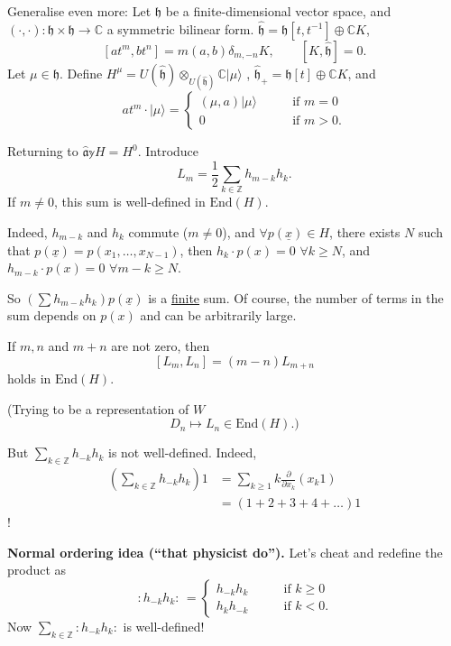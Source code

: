 \medskip\noindent
Generalise even more: Let $\mathfrak{h}$ be a finite-dimensional
vector space, and 
$(\cdot,\cdot): \mathfrak{h} \times \mathfrak{h} \to \mathbb{C}$
a symmetric bilinear form.
$\hat{\mathfrak{h}}=\mathfrak{h}[t,t^{-1}]\oplus \mathbb{C}K$,
$$
[at^m,bt^n]=m(a,b)\delta_{m,-n}K,\qquad [K,\hat{\mathfrak{h}}]=0.
$$
Let $\mu\in \mathfrak{h}$. Define
$H^\mu=U(\hat{\mathfrak{h}})\otimes_{U(\hat{\mathfrak{h}})}\mathbb{C}|\mu\rangle$ 
, $\hat{\mathfrak{h}}_+=\mathfrak{h}[t]\oplus\mathbb{C}K$, and
$$
at^m\cdot |\mu\rangle=\begin{cases}
(\mu,a)|\mu\rangle\qquad &\text{if } m=0\\
0\qquad &\text{if }m>0.
\end{cases}
$$ 

\medskip\noindent
Returning to $\hat{\mathfrak{a}}\mathbb{y}H=H^0$. Introduce
$$
L_m=\frac{1}{2}\sum_{k \in \mathbb{Z}}h_{m-k}h_k.
$$
If $m \neq 0$, this sum is well-defined in $\text{End}(H)$.

Indeed, $h_{m-k}$ and $h_k$ commute ($m \neq 0$), and 
$\forall  p(\underline{x})\in H$, there exists $N$ 
such that $p(\underline{x})=p(x_1,\ldots,x_{N-1})$,
then $h_k\cdot p(x)=0$ $\forall  k \geq N$,
and $h_{m-k}\cdot p(x)=0$ $\forall m-k \geq N$.

So $(\sum h_{m-k}h_k)p(\underline{x})$ is a \underline{finite} sum.
Of course, the number of terms in the sum depends on $p(x)$ and can be
arbitrarily large.

\begin{exercise}
\label{exercise-hard}
If  $m,n$ and $m+n$ are not zero, then
$$
[L_m,L_n]=(m-n)L_{m+n}
$$
holds in $\text{End}(H)$.

(Trying to be a representation of $W$
 $$
D_n \mapsto L_n \in \text{End}(H).)
$$
\end{exercise}

But $\sum_{k \in \mathbb{Z}}h_{-k}h_k$ is not well-defined.
Indeed,
\begin{align*}
\left(\sum_{k \in \mathbb{Z}}h_{-k}h_k\right)1&=
\sum_{k \geq 1}k\frac{\partial }{\partial x_k}(x_k 1)\\
&=(1+2+3+4+\ldots)1
\end{align*}
!

\medskip\noindent
{\bf Normal ordering idea (``that physicist do'').} Let's cheat
and redefine the product as
$$
\,:\!h_{-k}h_k\!:\,
=\begin{cases}
h_{-k}h_k\qquad & \text{if }k\geq 0\\
h_k h_{-k}\qquad &\text{if }k<0.
\end{cases}
$$
Now $\sum_{k \in \mathbb{Z}}:\!h_{-k}h_k\!:$ is well-defined! 

